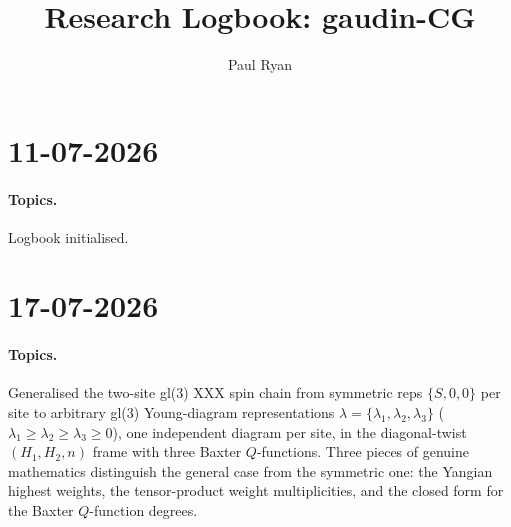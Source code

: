 \documentclass[12pt]{article}
\title{Research Logbook: gaudin-CG}
\author{Paul Ryan}
\begin{document}
\maketitle

\tableofcontents

\section{11-07-2026}

\paragraph{Topics.}
Logbook initialised.

\section{17-07-2026}

\paragraph{Topics.}
Generalised the two-site gl(3) XXX spin chain from symmetric reps
$\{S,0,0\}$ per site to arbitrary gl(3) Young-diagram representations
$\lambda=\{\lambda_1,\lambda_2,\lambda_3\}$ ($\lambda_1\ge\lambda_2\ge\lambda_3\ge0$),
one independent diagram per site, in the diagonal-twist $(H_1,H_2,n)$
frame with three Baxter $Q$-functions. Three pieces of genuine
mathematics distinguish the general case from the symmetric one: the
Yangian highest weights, the tensor-product weight multiplicities, and
the closed form for the Baxter $Q$-function degrees.
\end{document}
